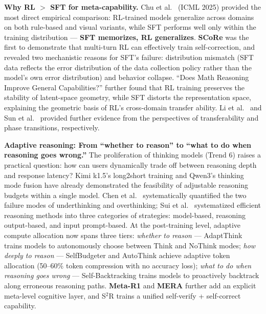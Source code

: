 \noindent
\textbf{Why RL $>$ SFT for meta-capability.}
Chu et al.\ \cite{chu2025sftrl} (ICML 2025) provided the most direct empirical comparison:
RL-trained models generalize across domains on both rule-based and visual variants,
while SFT performs well only within the training distribution ---
\textbf{SFT memorizes, RL generalizes}.
\textbf{SCoRe} \cite{kumar2024score}
was the first to demonstrate that multi-turn RL can effectively train self-correction,
and revealed two mechanistic reasons for SFT's failure:
distribution mismatch (SFT data reflects the error distribution of the data collection policy
rather than the model's own error distribution) and behavior collapse.
``Does Math Reasoning Improve General Capabilities?'' \cite{mathreasoning2025}
further found that RL training preserves the stability of latent-space geometry,
while SFT distorts the representation space, explaining the geometric basis of RL's cross-domain transfer ability.
Li et al.\ \cite{transfer2025} and Sun et al.\ \cite{sun2025grokking}
provided further evidence from the perspectives of transferability and phase transitions, respectively.

\noindent
\textbf{Adaptive reasoning: From ``whether to reason'' to ``what to do when reasoning goes wrong.''}
The proliferation of thinking models (Trend 6) raises a practical question:
how can users dynamically trade off between reasoning depth and response latency?
Kimi k1.5's long2short training \cite{moonshot2025kimi} and
Qwen3's thinking mode fusion \cite{yang2025qwen3}
have already demonstrated the feasibility of adjustable reasoning budgets within a single model.
Chen et al.\ \cite{chen2025underthinking} systematically quantified
the two failure modes of underthinking and overthinking;
Sui et al.\ \cite{sui2025stopoverthinking} systematized efficient reasoning methods into
three categories of strategies: model-based, reasoning output-based, and input prompt-based.
At the post-training level, adaptive compute allocation now spans three tiers:
\textit{whether to reason} --- AdaptThink \cite{zhang2025adaptthink} trains models to autonomously choose between Think and NoThink modes;
\textit{how deeply to reason} --- SelfBudgeter \cite{selfbudgeter2025}
and AutoThink \cite{tu2025autothink} achieve adaptive token allocation
(50--60\% token compression with no accuracy loss);
\textit{what to do when reasoning goes wrong} --- Self-Backtracking \cite{selfbacktracking2025}
trains models to proactively backtrack along erroneous reasoning paths.
\textbf{Meta-R1} \cite{dong2025metar1} and \textbf{MERA} \cite{ha2025mera}
further add an explicit meta-level cognitive layer,
and S$^2$R \cite{ma2025s2r} trains a unified self-verify + self-correct capability.

